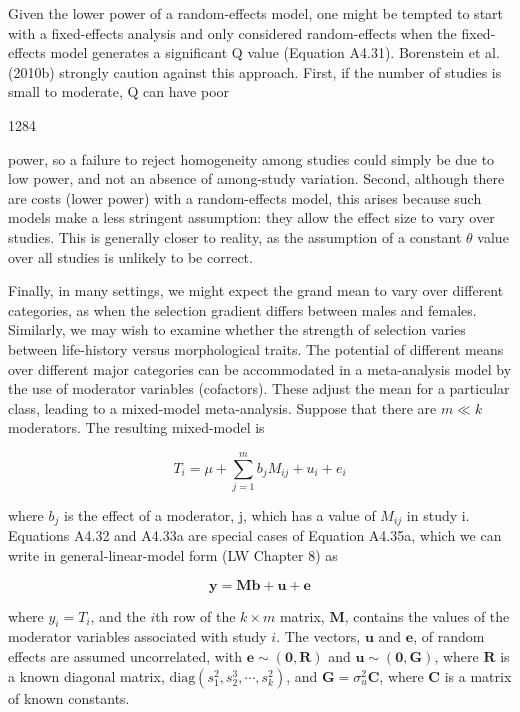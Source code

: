 \documentclass{article}
\begin{document}
Given the lower power of a random-effects model, one might be tempted to start with a fixed-effects analysis and only considered random-effects when the fixed-effects model generates a significant Q value (Equation A4.31). Borenstein et al. (2010b) strongly caution against this approach. First, if the number of studies is small to moderate, Q can have poor

1284

power, so a failure to reject homogeneity among studies could simply be due to low power, and not an absence of among-study variation. Second, although there are costs (lower power) with a random-effects model, this arises because such models make a less stringent assumption: they allow the effect size to vary over studies. This is generally closer to reality, as the assumption of a constant  $ \theta $ value over all studies is unlikely to be correct.

Finally, in many settings, we might expect the grand mean to vary over different categories, as when the selection gradient differs between males and females. Similarly, we may wish to examine whether the strength of selection varies between life-history versus morphological traits. The potential of different means over different major categories can be accommodated in a meta-analysis model by the use of moderator variables (cofactors). These adjust the mean for a particular class, leading to a mixed-model meta-analysis. Suppose that there are  $ m \ll k $ moderators. The resulting mixed-model is

\begin{equation}
T_{i}=\mu+\sum_{j=1}^{m}b_{j}M_{ij}+u_{i}+e_{i}
\end{equation}

where  $ b_{j} $ is the effect of a moderator, j, which has a value of  $ M_{ij} $ in study i. Equations A4.32 and A4.33a are special cases of Equation A4.35a, which we can write in general-linear-model form (LW Chapter 8) as

\begin{equation}
\mathbf{y}=\mathbf{M}\mathbf{b}+\mathbf{u}+\mathbf{e}
\end{equation}

where  $ y_i = T_i $, and the  $ i $th row of the  $ k \times m $ matrix,  $ \mathbf{M} $, contains the values of the moderator variables associated with study  $ i $. The vectors,  $ \mathbf{u} $ and  $ \mathbf{e} $, of random effects are assumed uncorrelated, with  $ \mathbf{e} \sim (\mathbf{0}, \mathbf{R}) $ and  $ \mathbf{u} \sim (\mathbf{0}, \mathbf{G}) $, where  $ \mathbf{R} $ is a known diagonal matrix,  $ \text{diag}(s_1^2, s_2^3, \cdots, s_k^2) $, and  $ \mathbf{G} = \sigma_u^2 \mathbf{C} $, where  $ \mathbf{C} $ is a matrix of known constants.
\end{document}
